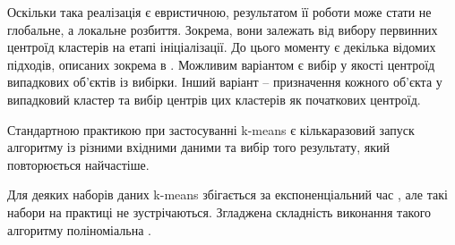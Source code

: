        Оскільки така реалізація є евристичною, результатом її роботи може стати не глобальне, а локальне розбиття. Зокрема, вони залежать від вибору первинних центроїд кластерів на етапі ініціалізації. До цього моменту є декілька відомих підходів, описаних зокрема в \cite{HamerlyKMeansOptimization}. Можливим варіантом є вибір у якості центроїд випадкових об'єктів із вибірки. Інший варіант -- призначення кожного об'єкта у випадковий кластер та вибір центрів цих кластерів як початкових центроїд.
        
        Стандартною практикою при застосуванні k-means є кількаразовий запуск алгоритму із різними вхідними даними та вибір того результату, який повторюється найчастіше.
        
        Для деяких наборів даних k-means збігається за експоненціальний час \cite{KMeansWorstCaseComplexity}, але такі набори на практиці не зустрічаються. Згладжена складність виконання такого алгоритму поліноміальна \cite{KMeansSmoothedComplexity}.
